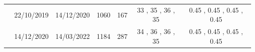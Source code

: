 \documentclass[authoryear,review,11pt]{elsarticle}
\begin{document}
\begin{scriptsize}
\begin{longtable}{ccccccc}
		& 22/10/2019                      & 14/12/2020                    & 1060                       & 167                       & 33                          , 35                          , 36                          , 35                          & 0.45                        , 0.45                        , 0.45                        , 0.45                        \\
		& 14/12/2020                      & 14/03/2022                    & 1184                       & 287                       & 34                          , 36                          , 36                          , 35                          & 0.45                        , 0.45                        , 0.45                        , 0.45                        \\
		\bottomrule	
	\end{longtable}
\end{scriptsize}
\end{document}
